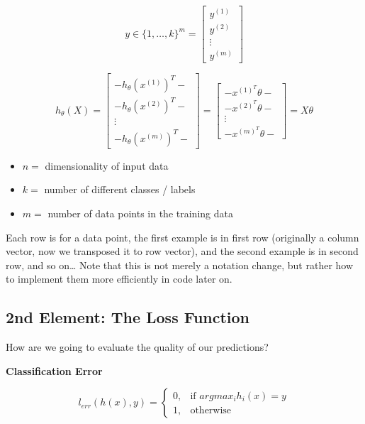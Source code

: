 \documentclass[
  letterpaper,
  DIV=11,
  numbers=noendperiod]{scrreprt}
\providecommand{\tightlist}{%
  \setlength{\itemsep}{0pt}\setlength{\parskip}{0pt}}
\begin{document}
\[y \in \{ 1, \dots, k \}^m = \begin{bmatrix} y^{(1)} \\ y^{(2)} \\ \vdots \\ y^{(m)}  \end{bmatrix}\]

\[h_\theta(X) = \begin{bmatrix} -h_\theta(x^{(1)})^{T}- \\ -h_\theta(x^{(2)})^{T}- \\ \vdots \\ -h_\theta(x^{(m)})^{T}- \end{bmatrix} = \begin{bmatrix} -x^{(1)^{T}} \theta- \\ -x^{(2)^{T}} \theta- \\ \vdots \\ -x^{(m)^{T}} \theta- \end{bmatrix} = X\theta\]

\begin{itemize}
\tightlist
\item
  \(n =\) dimensionality of input data
\item
  \(k =\) number of different classes / labels
\item
  \(m =\) number of data points in the training data
\end{itemize}

Each row is for a data point, the first example is in first row
(originally a column vector, now we transposed it to row vector), and
the second example is in second row, and so on\ldots{} Note that this is
not merely a notation change, but rather how to implement them more
efficiently in code later on.

\subsection*{2nd Element: The Loss
Function}\label{nd-element-the-loss-function}

How are we going to evaluate the quality of our predictions?

\textbf{Classification Error}

\[l_{err}(h(x),y) = \begin{cases} 0, & \text{if } argmax_i h_i(x) = y \\ 1, & \text{otherwise} \end{cases}\]
\end{document}
